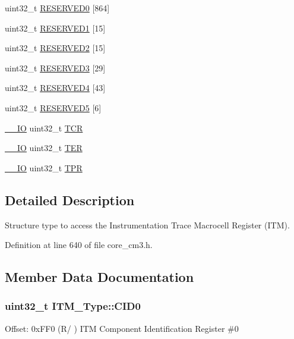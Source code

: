 \begin{DoxyCompactItemize}
\begin{tabbing}
\end{tabbing}\item 
uint32\+\_\+t \hyperlink{structITM__Type_a2c5ae30385b5f370d023468ea9914c0e}{R\+E\+S\+E\+R\+V\+E\+D0} \mbox{[}864\mbox{]}
\item 
uint32\+\_\+t \hyperlink{structITM__Type_afffce5b93bbfedbaee85357d0b07ebce}{R\+E\+S\+E\+R\+V\+E\+D1} \mbox{[}15\mbox{]}
\item 
uint32\+\_\+t \hyperlink{structITM__Type_af56b2f07bc6b42cd3e4d17e1b27cff7b}{R\+E\+S\+E\+R\+V\+E\+D2} \mbox{[}15\mbox{]}
\item 
uint32\+\_\+t \hyperlink{structITM__Type_ab7708f0bcbbe9987cceadc4748c7e6b7}{R\+E\+S\+E\+R\+V\+E\+D3} \mbox{[}29\mbox{]}
\item 
uint32\+\_\+t \hyperlink{structITM__Type_a45ad0b376a0a0f2ade55bbb7daf64ff2}{R\+E\+S\+E\+R\+V\+E\+D4} \mbox{[}43\mbox{]}
\item 
uint32\+\_\+t \hyperlink{structITM__Type_a7f70161bc2441d430b5c9d55aa7b7b5e}{R\+E\+S\+E\+R\+V\+E\+D5} \mbox{[}6\mbox{]}
\item 
\hyperlink{core__cm3_8h_aec43007d9998a0a0e01faede4133d6be}{\+\_\+\+\_\+\+IO} uint32\+\_\+t \hyperlink{structITM__Type_a58f169e1aa40a9b8afb6296677c3bb45}{T\+CR}
\item 
\hyperlink{core__cm3_8h_aec43007d9998a0a0e01faede4133d6be}{\+\_\+\+\_\+\+IO} uint32\+\_\+t \hyperlink{structITM__Type_a91a040e1b162e1128ac1e852b4a0e589}{T\+ER}
\item 
\hyperlink{core__cm3_8h_aec43007d9998a0a0e01faede4133d6be}{\+\_\+\+\_\+\+IO} uint32\+\_\+t \hyperlink{structITM__Type_a93b480aac6da620bbb611212186d47fa}{T\+PR}
\end{DoxyCompactItemize}


\subsection{Detailed Description}
Structure type to access the Instrumentation Trace Macrocell Register (I\+TM). 

Definition at line 640 of file core\+\_\+cm3.\+h.



\subsection{Member Data Documentation}
\subsubsection[{\texorpdfstring{C\+I\+D0}{CID0}}]{ uint32\+\_\+t I\+T\+M\+\_\+\+Type\+::\+C\+I\+D0}\hypertarget{structITM__Type_a413f3bb0a15222e5f38fca4baeef14f6}{}\label{structITM__Type_a413f3bb0a15222e5f38fca4baeef14f6}
Offset\+: 0x\+F\+F0 (R/ ) I\+TM Component Identification Register \#0 


